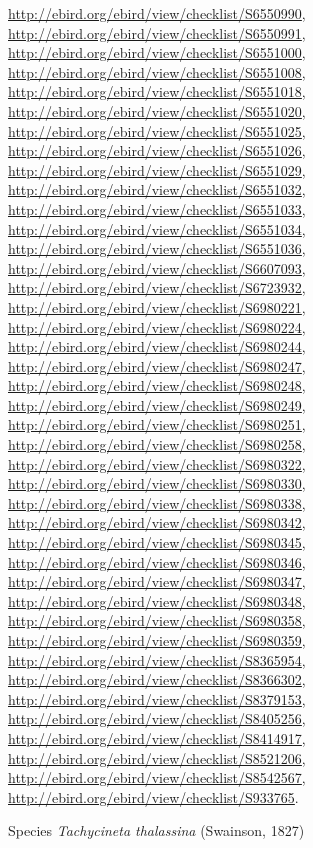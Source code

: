 \documentclass[9pt, article]{memoir}
\begin{document}
\begin{multicols}{2}
\url{http://ebird.org/ebird/view/checklist/S6550990}, 
\url{http://ebird.org/ebird/view/checklist/S6550991}, 
\url{http://ebird.org/ebird/view/checklist/S6551000}, 
\url{http://ebird.org/ebird/view/checklist/S6551008}, 
\url{http://ebird.org/ebird/view/checklist/S6551018}, 
\url{http://ebird.org/ebird/view/checklist/S6551020}, 
\url{http://ebird.org/ebird/view/checklist/S6551025}, 
\url{http://ebird.org/ebird/view/checklist/S6551026}, 
\url{http://ebird.org/ebird/view/checklist/S6551029}, 
\url{http://ebird.org/ebird/view/checklist/S6551032}, 
\url{http://ebird.org/ebird/view/checklist/S6551033}, 
\url{http://ebird.org/ebird/view/checklist/S6551034}, 
\url{http://ebird.org/ebird/view/checklist/S6551036}, 
\url{http://ebird.org/ebird/view/checklist/S6607093}, 
\url{http://ebird.org/ebird/view/checklist/S6723932}, 
\url{http://ebird.org/ebird/view/checklist/S6980221}, 
\url{http://ebird.org/ebird/view/checklist/S6980224}, 
\url{http://ebird.org/ebird/view/checklist/S6980244}, 
\url{http://ebird.org/ebird/view/checklist/S6980247}, 
\url{http://ebird.org/ebird/view/checklist/S6980248}, 
\url{http://ebird.org/ebird/view/checklist/S6980249}, 
\url{http://ebird.org/ebird/view/checklist/S6980251}, 
\url{http://ebird.org/ebird/view/checklist/S6980258}, 
\url{http://ebird.org/ebird/view/checklist/S6980322}, 
\url{http://ebird.org/ebird/view/checklist/S6980330}, 
\url{http://ebird.org/ebird/view/checklist/S6980338}, 
\url{http://ebird.org/ebird/view/checklist/S6980342}, 
\url{http://ebird.org/ebird/view/checklist/S6980345}, 
\url{http://ebird.org/ebird/view/checklist/S6980346}, 
\url{http://ebird.org/ebird/view/checklist/S6980347}, 
\url{http://ebird.org/ebird/view/checklist/S6980348}, 
\url{http://ebird.org/ebird/view/checklist/S6980358}, 
\url{http://ebird.org/ebird/view/checklist/S6980359}, 
\url{http://ebird.org/ebird/view/checklist/S8365954}, 
\url{http://ebird.org/ebird/view/checklist/S8366302}, 
\url{http://ebird.org/ebird/view/checklist/S8379153}, 
\url{http://ebird.org/ebird/view/checklist/S8405256}, 
\url{http://ebird.org/ebird/view/checklist/S8414917}, 
\url{http://ebird.org/ebird/view/checklist/S8521206}, 
\url{http://ebird.org/ebird/view/checklist/S8542567}, 
\url{http://ebird.org/ebird/view/checklist/S933765}.

\vspace{6pt}\noindent\hspace{36pt}Species \textit{Tachycineta thalassina} (Swainson, 1827)



\end{multicols}
\end{document}
